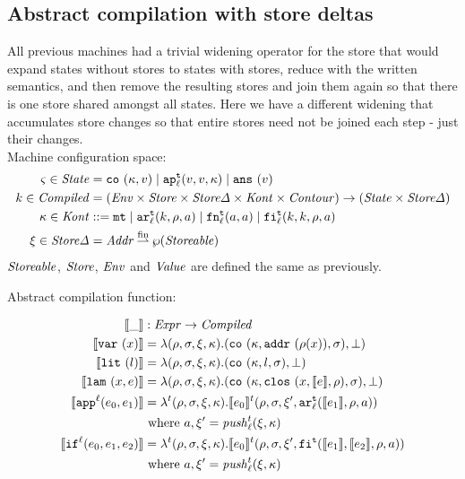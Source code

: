\documentclass{llncs}
\newcommand{\finto}{\mathbin{\overset{\text{fin}}{\rightharpoonup}}}
\newcommand{\alt}{\mid}
\begin{document}
\subsection{Abstract compilation with store deltas}

All previous machines had a trivial widening operator for the store
that would expand states without stores to states with stores, reduce
with the written semantics, and then remove the resulting stores and
join them again so that there is one store shared amongst all
states. Here we have a different widening that accumulates store
changes so that entire stores need not be joined each step - just
their changes.
\\
Machine configuration space:
\begin{align*}
\mstate \in \State &= \co{\mkont, \mval} \alt
                     \ap[_\mlab^\mcntr]{\mval,\mval,\mkont} \alt
                     \ans{\mval} \\
\mcomp \in \Compiled &=
  (\Env \times \Store \times \StoreDelta \times \Kont \times \Counter) \to
   (\State \times \StoreDelta) \\
\mkont \in \Kont &::= \kmt \alt
                      \kar[_\mlab^\mcntr]{\mcomp, \menv, \maddr} \alt
                      \kfn[_\mlab^\mcntr]{\maddr, \maddr} \alt
                      \kif[_\mlab^\mcntr]{\mcomp, \mcomp, \menv, \maddr} \\
\msdiff \in \StoreDelta &= \Addr \finto \wp(\Storeable) \\
\end{align*}
$\Storeable$, $\Store$, $\Env$ and $\Value$ are defined the same as previously.

Abstract compilation function:

\begin{align*}
\compile{\_} &: \Expr \to \Compiled \\
\compile{\svar\mvar} &= \lambda(\menv,\msto,\msdiff, \mkont) .\ttuple{\co{\mkont,\saddr{\menv(\mvar)},\msto}}{\bot}
\\
\compile{\slit\mlit} &= \lambda(\menv,\msto,\msdiff,\mkont) .
\ttuple{\co{\mkont,\mlit,\msto}}{\bot}
\\
\compile{\slam\mvar\mexp} &= \lambda(\menv,\msto,\msdiff,\mkont) .
\ttuple{\co{\mkont,\clos{\mvar,\compile\mexp,\menv},\msto}}{\bot}
\\
\compile{\sapp[^\mlab]{\mexpi0}{\mexpi1}} &= \lambda^\mcntr (\menv,\msto,\msdiff,\mkont) .
\compile{\mexpi0}^\mcntr(\menv,\msto,\msdiff',\kar[_\mlab^\mcntr]{\compile{\mexpi1},\menv,\maddr})
\\
&
\text{ where }\maddr,\msdiff' = \push^\mcntr_\mlab(\msdiff,\mkont)
\\
\compile{\sif[^\mlab]{\mexpi0}{\mexpi1}{\mexpi2}} &= \lambda^\mcntr(\menv,\msto,\msdiff,\mkont) .
\compile{\mexpi0}^\mcntr(\menv,\msto,\msdiff',\kif[^\mcntr]{\compile{\mexpi1},\compile{\mexpi2},\menv,\maddr})
\\
&\text{ where }\maddr,\msdiff' = \push_\mlab^\mcntr(\msdiff,\mkont)
\end{align*}
\end{document}
